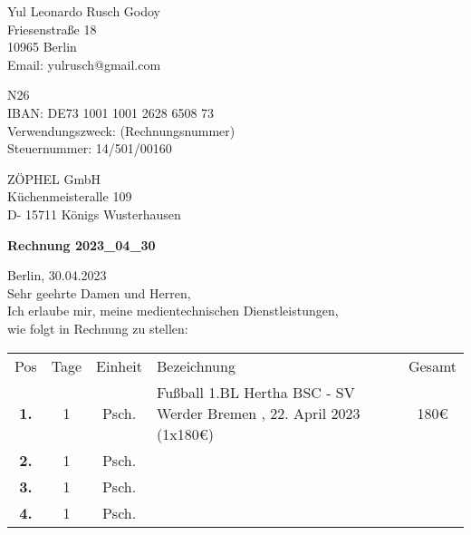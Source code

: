 \documentclass[12pt]{article}
\begin{document}

\begin{flushright}

Yul Leonardo Rusch Godoy\\
Friesenstraße 18\\
10965 Berlin\\
Email: yulrusch@gmail.com\\

\vspace{0.5cm}

N26\\
IBAN: DE73 1001 1001 2628 6508 73\\
Verwendungszweck: (Rechnungsnummer)\\
Steuernummer: 14/501/00160\\

\end{flushright}

\vspace{0.5cm}

\begin{flushleft}

ZÖPHEL GmbH\\
Küchenmeisteralle 109\\
D- 15711 Königs Wusterhausen\\

\vspace{2cm}

\textbf{Rechnung 2023\_04\_30\\}

\vspace{0.5cm}

Berlin, 30.04.2023\\
Sehr geehrte Damen und Herren,\\
Ich erlaube mir, meine medientechnischen Dienstleistungen,\\
wie folgt in Rechnung zu stellen:\\

\end{flushleft}

\begin{flushleft}
\begin{tabular}{c c c p{9.7cm} c}
Pos & Tage & Einheit & Bezeichnung & Gesamt\\ 
\rowcolor{lightgrey}
\textbf{1.} & 1 & Psch. & Fußball 1.BL Hertha BSC - SV Werder Bremen , 22. April 2023 (1x180€) & 180€\\ 
\textbf{2.} & 1 & Psch. &  & \\ 
\rowcolor{lightgrey}
\textbf{3.} & 1 & Psch. &  & \\ 
\textbf{4.} & 1 & Psch. &  & \\ 
\end{tabular}        
\end{flushleft}
\end{document}
